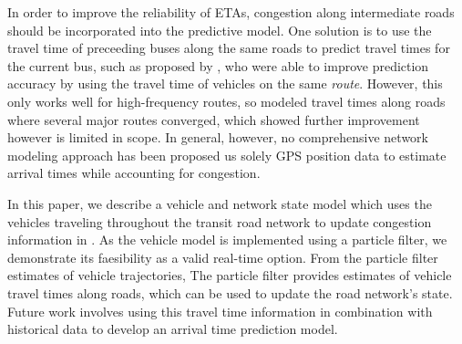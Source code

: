 In order to improve the reliability of ETAs,
congestion along intermediate roads should be incorporated into the predictive model.
One solution is to use the travel time of preceeding buses along the same roads
to predict travel times for the current bus,
such as proposed by \cite{Yu_2010},
who were able to improve prediction accuracy
by using the travel time of vehicles on the same \emph{route}.
However, this only works well for high-frequency routes, so
\cite{Yu_2011} modeled travel times along roads where several major routes converged,
which showed further improvement however is limited in scope.
In general, however, no comprehensive network modeling approach has been proposed us
solely GPS position data to estimate arrival times
while accounting for congestion.


In this paper, we describe a \rt vehicle and network state
model which uses the vehicles traveling throughout the transit road network
to update congestion information in \rt.
As the vehicle model is implemented using a particle filter,
we demonstrate its faesibility as a valid real-time option.
From the particle filter estimates of vehicle trajectories,  
The particle filter provides estimates of vehicle travel times along roads,
which can be used to update the road network's state.
Future work involves using this travel time information 
in combination with historical data to develop an arrival time prediction model.




